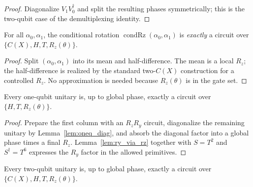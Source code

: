 \begin{proof}
  \leanok
  Diagonalize $V_1V_0^\dagger$ and split the resulting phases symmetrically;
  this is the two-qubit case of the demultiplexing identity.
\end{proof}

\begin{proposition}
  \label{prop:crz_pair}
  \leanok
  For all $\alpha_0,\alpha_1$, the conditional rotation
  $\operatorname{condRz}(\alpha_0,\alpha_1)$ is \emph{exactly} a circuit over
  $\{C(X), H, T, R_z(\theta)\}$.
\end{proposition}

\begin{proof}
  \leanok
  Split $(\alpha_0,\alpha_1)$ into its mean and half-difference.  The mean is a
  local $R_z$; the half-difference is realized by the standard
  two-$C(X)$ construction for a controlled $R_z$.  No approximation is needed
  because $R_z(\theta)$ is in the gate set.
\end{proof}

\begin{proposition}
  \label{prop:oneq_htrz}
  \leanok
  Every one-qubit unitary is, up to global phase, exactly a circuit over
  $\{H, T, R_z(\theta)\}$.
\end{proposition}

\begin{proof}
  \leanok
  Prepare the first column with an $R_zR_y$ circuit, diagonalize the remaining
  unitary by Lemma~\ref{lem:oneq_diag}, and absorb the diagonal factor into a
  global phase times a final $R_z$.  Lemma~\ref{lem:ry_via_rz} together with
  $S = T^2$ and $S^\dagger = T^6$ expresses the $R_y$ factor in the allowed
  primitives.
\end{proof}

\begin{lemma}[Lemma 11]
  \label{lem:lemma11}
  \leanok
  Every two-qubit unitary is, up to global phase, exactly a circuit over
  $\{C(X), H, T, R_z(\theta)\}$.
\end{lemma}

